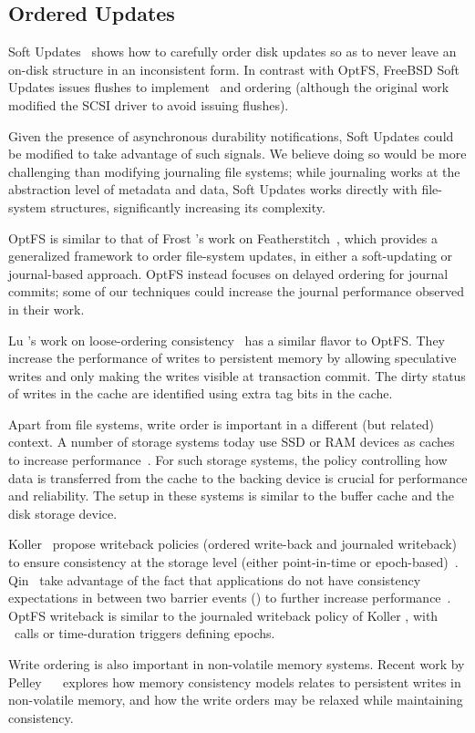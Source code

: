 \subsection{Ordered Updates}
\label{sec-related-ordered}

Soft Updates~\cite{GangerPatt-Metadata94} shows how to carefully order
disk updates so as to never leave an on-disk structure in an
inconsistent form. In contrast with OptFS, FreeBSD Soft Updates issues
flushes to implement \sysfsync\ and ordering (although the original
work modified the SCSI driver to avoid issuing flushes).

Given the presence of asynchronous durability notifications, Soft
Updates could be modified to take advantage of such signals. We
believe doing so would be more challenging than modifying journaling
file systems; while journaling works at the abstraction level of
metadata and data, Soft Updates works directly with file-system
structures, significantly increasing its complexity.

OptFS is similar to that of Frost \etal's work on
Featherstitch~\cite{Frost+07-GenFSDep}, which provides a generalized
framework to order file-system updates, in either a soft-updating or
journal-based approach. OptFS instead focuses on delayed ordering for
journal commits; some of our techniques could increase the journal
performance observed in their work.

Lu \etal's work on loose-ordering consistency~\cite{cmutechreport2011,
  lu2014loose} has a similar flavor to OptFS. They increase the
performance of writes to persistent memory by allowing speculative
writes and only making the writes visible at transaction commit. The
dirty status of writes in the cache are identified using extra tag
bits in the cache.

Apart from file systems, write order is important in a different (but
related) context. A number of storage systems today use SSD or RAM
devices as caches to increase performance~\cite{holland2013flash,
  saxena2012flashtier}. For such storage systems, the policy
controlling how data is transferred from the cache to the backing
device is crucial for performance and reliability. The setup in these
systems is similar to the buffer cache and the disk storage device.

Koller \etal\ propose writeback policies (ordered write-back and
journaled writeback) to ensure consistency at the storage level
(either point-in-time or epoch-based)~\cite{koller2013write}. Qin
\etal\ take advantage of the fact that applications do not have
consistency expectations in between two barrier events (\eg \sysfsync)
to further increase performance~\cite{qin2014reliable}. OptFS
writeback is similar to the journaled writeback policy of Koller
\etal, with \sysfsync\ calls or time-duration triggers defining epochs.

Write ordering is also important in non-volatile memory systems.
Recent work by Pelley \etal\ ~\cite{pelley2014memory} explores how
memory consistency models relates to persistent writes in non-volatile
memory, and how the write orders may be relaxed while maintaining
consistency.

